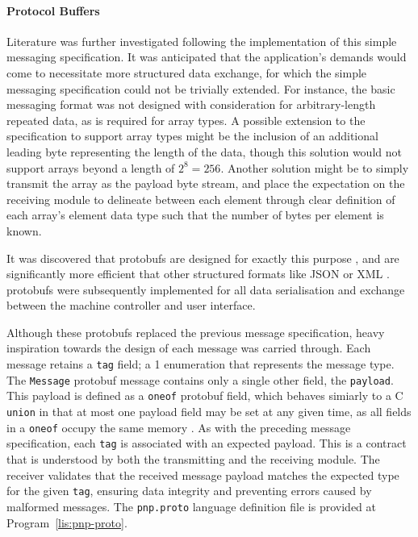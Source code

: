 \documentclass[12pt,british,UKenglish]{article}
\begin{document}
\paragraph{Protocol Buffers}
Literature was further investigated following the implementation of this simple messaging specification.
It was anticipated that the application's demands would come to necessitate more structured data exchange, for which the simple messaging specification could not be trivially extended.
For instance, the basic messaging format was not designed with consideration for arbitrary-length repeated data, as is required for array types.
A possible extension to the specification to support array types might be the inclusion of an additional leading byte representing the length of the data, though this solution would not support arrays beyond a length of $2^8 = 256$.
Another solution might be to simply transmit the array as the payload byte stream, and place the expectation on the receiving module to delineate between each element through clear definition of each array's element data type such that the number of bytes per element is known.

It was discovered that \acp{protobuf} are designed for exactly this purpose \cite{5982183}, and are significantly more efficient that other structured formats like \ac{JSON} or \ac{XML} \cite{6784954,8337257}.
\Aclp{protobuf} were subsequently implemented for all data serialisation and exchange between the machine controller and user interface.

Although these \acp{protobuf} replaced the previous message specification, heavy inspiration towards the design of each message was carried through.
Each message retains a \texttt{tag} field; a \qty{1}{\byte} enumeration that represents the message type.
The \texttt{Message} \ac{protobuf} message contains only a single other field, the \texttt{payload}.
This payload is defined as a \texttt{oneof} \ac{protobuf} field, which behaves simiarly to a C \texttt{union}
in that at most one payload field may be set at any given time, as all fields in a \texttt{oneof} occupy the same memory \cite{protobufLanguageGuide}.
As with the preceding message specification, each \texttt{tag} is associated with an expected payload.
This is a contract that is understood by both the transmitting and the receiving module.
The receiver validates that the received message payload matches the expected type for the given \texttt{tag}, ensuring data integrity and preventing errors caused by malformed messages.
The \texttt{pnp.proto} language definition file is provided at Program~\ref{lis:pnp-proto}.
\end{document}
